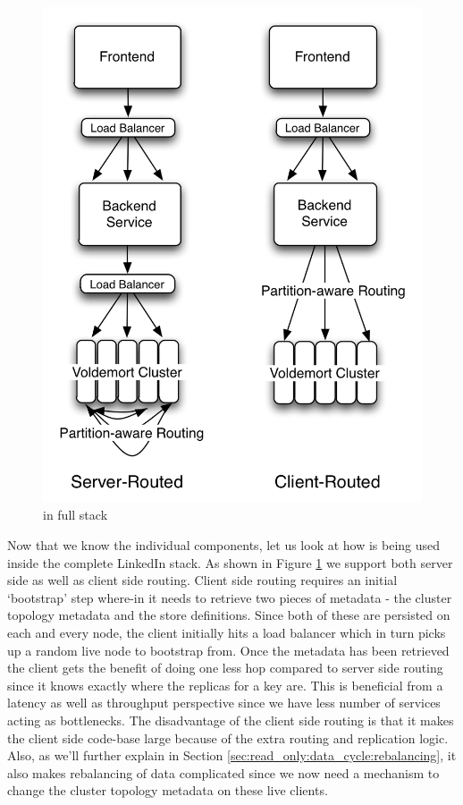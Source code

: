 \documentclass[10pt,twocolumn,preprint,natbib,authoryear]{sigplanconf}
\begin{document}
\begin{figure}
  \centering
    \includegraphics[scale=0.60]{images/fullstack.png}
  \caption{\projectname{} in full stack}
  \label{fullstack}
\end{figure}


\noindent 
Now that we know the individual components, let us look at how \projectname{} is being used inside the complete LinkedIn stack. As shown in Figure \ref{fullstack} we support both server side as well as client side routing. Client side routing requires an initial `bootstrap' step where-in it needs to retrieve two pieces of metadata - the cluster topology metadata and the store definitions. Since both of these are persisted on each and every \projectname{} node, the client initially hits a load balancer which in turn picks up a random live node to bootstrap from. Once the metadata has been retrieved the client gets the benefit of doing one less hop compared to server side routing since it knows exactly where the replicas for a key are. This is beneficial from a latency as well as throughput perspective since we have less number of services acting as bottlenecks. The disadvantage of the client side routing is that it makes the client side code-base large because of the extra routing and replication logic. Also, as we'll further explain in Section \ref{sec:read_only:data_cycle:rebalancing}, it also makes rebalancing of data complicated since we now need a mechanism to change the cluster topology metadata on these live clients. 
\end{document}
